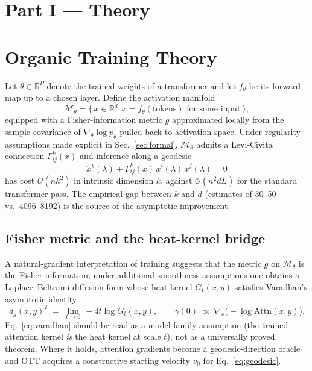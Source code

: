 \documentclass[11pt]{article}
\begin{document}
\section*{Part I --- Theory}

\section{Organic Training Theory}
\label{sec:ott}

Let $\theta\in\mathbb{R}^P$ denote the trained weights of a transformer and let
$f_\theta$ be its forward map up to a chosen layer. Define the activation
manifold
\begin{equation}
\mathcal{M}_\theta = \{\,x\in\mathbb{R}^d : x = f_\theta(\text{tokens}) \text{ for some input}\,\},
\end{equation}
equipped with a Fisher-information metric $g$ approximated locally from the
sample covariance of $\nabla_\theta\log p_\theta$ pulled back to activation
space. Under regularity assumptions made explicit in Sec.~\ref{sec:formal},
$\mathcal{M}_\theta$ admits a Levi-Civita connection
$\Gamma^k_{ij}(x)$ and inference along a geodesic
\begin{equation}
\ddot x^k(\lambda) + \Gamma^k_{ij}(x)\,\dot x^i(\lambda)\,\dot x^j(\lambda) = 0
\label{eq:geodesic}
\end{equation}
has cost $\mathcal{O}(nk^2)$ in intrinsic dimension $k$, against
$\mathcal{O}(n^2 dL)$ for the standard transformer pass. The empirical
gap between $k$ and $d$ (estimates of 30--50 vs.\ 4096--8192) is the source of
the asymptotic improvement.

\subsection{Fisher metric and the heat-kernel bridge}

A natural-gradient interpretation of training
\cite{golub1996matrix,nakkiran2021deep} suggests that the metric $g$ on
$\mathcal{M}_\theta$ is the Fisher information; under additional smoothness
assumptions one obtains a Laplace--Beltrami diffusion form whose heat kernel
$G_t(x,y)$ satisfies Varadhan's asymptotic identity
\begin{equation}
d_g(x,y)^2 \;=\; \lim_{t\to 0}\,-4t\log G_t(x,y),\qquad
\dot\gamma(0)\;\propto\;\nabla_x\bigl(-\log\mathrm{Attn}(x,y)\bigr).
\label{eq:varadhan}
\end{equation}
Eq.~\eqref{eq:varadhan} should be read as a model-family assumption (the
trained attention kernel \emph{is} the heat kernel at scale $t$), not as a
universally proved theorem. Where it holds, attention gradients become a
geodesic-direction oracle and OTT acquires a constructive starting velocity
$v_0$ for Eq.~\eqref{eq:geodesic}.
\end{document}

